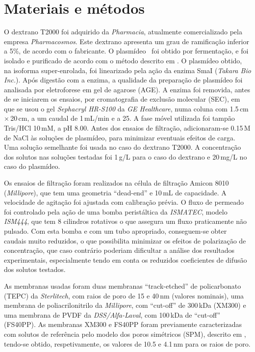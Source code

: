 \section{Materiais e métodos}
O dextrano T2000 foi adquirido da \emph{Pharmacia}, atualmente comercializado pela empresa \emph{Pharmacosmos}. Este dextrano apresenta um grau de ramificação inferior a 5\%, de acordo com o fabricante. O plasmídeo \pUC\ foi obtido por fermentação, e foi isolado e purificado de acordo com o método descrito em \cite{sousabab}.
%
O plasmídeo obtido, na isoforma super-enrolada, foi linearizado pela ação da enzima SmaI (\emph{Takara Bio Inc.}). Após digestão com a enzima, a qualidade da preparação de plasmídeo foi analisada por eletroforese em gel de agarose (AGE). A enzima foi removida, antes de se iniciarem os ensaios, por cromatografia de exclusão molecular (SEC), em que se usou o gel \emph{Sephacryl HR-S100} da \emph{GE Healthcare}, numa coluna com 1.5\,cm\,$\times$\,20\,cm, a um caudal de 1\,mL/min e a 25\degreecelsius.
%
A fase móvel utilizada foi tampão Tris/HCl 10\,mM, a pH 8.00.
%
Antes dos ensaios de filtração, adicionaram-se 0.15\,M de NaCl às soluções de plasmídeo, para minimizar eventuais efeitos de carga.
%
Uma solução semelhante foi usada no caso do dextrano T2000. A concentração dos solutos nas soluções testadas foi 1\,g/L para o caso do dextrano e 20\,mg/L no caso do plasmídeo.

Os ensaios de filtração foram realizados na célula de filtração Amicon 8010 (\emph{Millipore}), que tem uma geometria ``dead-end'' e 10\,mL de capacidade.
A velocidade de agitação foi ajustada com calibração prévia. O fluxo de permeado foi controlado pela ação de uma bomba peristáltica da \emph{ISMATEC}, modelo \emph{ISM444}, que tem 8 cilindros rotativos o que assegura um fluxo praticamente não pulsado.
%
Com esta bomba e com um tubo apropriado, conseguem-se obter caudais muito reduzidos, o que possibilita minimizar os efeitos de polarização de concentração, que caso contrário poderiam dificultar a análise dos resultados experimentais, especialmente tendo em conta os reduzidos coeficientes de difusão dos solutos testados. 

As membranas usadas foram duas membranas ``track-etched'' de policarbonato (TEPC) da \emph{Sterlitech}, com raios de poro de 15 e 40\,nm (valores nominais), uma membrana de poliacrilonitrilo da \emph{Millipore}, com ``cut-off'' de 300\,kDa (XM300) e uma membrana de PVDF da \emph{DSS/Alfa-Laval}, com 100\,kDa de ``cut-off'' (FS40PP).
%
%
%
%
%
As membranas XM300 e FS40PP foram previamente caracterizadas com solutos de referência pelo modelo dos poros simétricos (SPM), descrito em \cite{moraompa}, tendo-se obtido, respetivamente, os valores de 10.5 e 4.1\,nm para os raios de poro.
%

